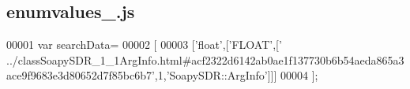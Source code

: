 \subsection{enumvalues\+\_.\+js}
\label{enumvalues__2_8js_source}

\begin{DoxyCode}
00001 var searchData=
00002 [
00003   [\textcolor{stringliteral}{'float'},[\textcolor{stringliteral}{'FLOAT'},[\textcolor{stringliteral}{'
      ../classSoapySDR\_1\_1ArgInfo.html#acf2322d6142ab0ae1f137730b6b54aeda865a3ace9f9683e3d80652d7f85bc6b7'},1,\textcolor{stringliteral}{'SoapySDR::ArgInfo'}]]]
00004 ];
\end{DoxyCode}
